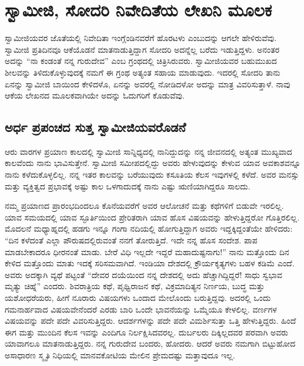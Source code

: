 
\chapter{ಸ್ವಾಮೀಜಿ, ಸೋದರಿ ನಿವೇದಿತೆಯ ಲೇಖನಿ ಮೂಲಕ}

 ಸ್ವಾಮೀಜಿಯವರ ಜೊತೆಯಲ್ಲಿ ನಿವೇದಿತಾ ಇಂಗ್ಲೆಂಡಿನವರೆಗೆ ಹೊರಟಳು ಎಂಬುದನ್ನು ಆಗಲೇ ಹೇಳಿರುವೆವು. ಸ್ವಾಮೀಜಿ ಪ್ರತಿದಿನವೂ ಆಕೆಯೊಡನೆ ಮಾತನಾಡುತ್ತಿದ್ದಾಗ ಸೋದರಿ ಅದನ್ನೆಲ್ಲ ಬರೆದು ಇಡುತ್ತಿದ್ದಳು. ಅನಂತರ ಅದನ್ನು “ನಾ ಕಂಡಂತೆ ನನ್ನ ಗುರುದೇವ” ಎಂಬ ಗ್ರಂಥದಲ್ಲಿ ಚಿತ್ರಿಸಿರುವರು. ಸ್ವಾಮೀಜಿಯವರ ಬಹುಮುಖದ ಶೀಲವನ್ನು ತಿಳಿದುಕೊಳ್ಳುವುದಕ್ಕೆ ನಮಗೆ ಈ ಗ್ರಂಥ ಅತ್ಯಂತ ಸಹಾಯ ಮಾಡುವುದು. ಇದರಲ್ಲಿ ಸೋದರಿ ತಾನು ಏನನ್ನು ಸ್ವಾಮೀಜಿ ಬಾಯಿಂದ ಕೇಳಿದಳೊ, ಏನನ್ನು ಅವರಲ್ಲಿ ನೋಡಿದಳೋ ಅದನ್ನು ಮಾತ್ರ ವಿವರಿಸುತ್ತಾಳೆ. ನಾವು ಆಕೆಯ ಲೇಖನದ ಮೂಲಕವಾಗಿಯೇ ಅದನ್ನು ಓದುಗರಿಗೆ ಕೊಡುವೆವು.

\section*{ಅರ್ಧ ಪ್ರಪಂಚದ ಸುತ್ತ ಸ್ವಾಮೀಜಿಯವರೊಡನೆ }

 ಆರು ವಾರಗಳ ಪ್ರಯಾಣ ಕಾಲದಲ್ಲಿ ಸ್ವಾಮೀಜಿ ಸಾನ್ನಿಧ್ಯದಲ್ಲಿ ನಾನಿದ್ದುದನ್ನು ನನ್ನ ಜೀವನದಲ್ಲಿ ಅತ್ಯಂತ ಮುಖ್ಯವಾದ ಕಾಲವೆಂದು ನಾನು ಭಾವಿಸುತ್ತೇನೆ. ಸ್ವಾಮೀಜಿ ಸಮೀಪದಲ್ಲಿದ್ದು ಅವರು ಹೇಳುವುದನ್ನು ಕೇಳುವ ಯಾವ ಅವಕಾಶವನ್ನೂ ನಾನು ಕಳೆದುಕೊಳ್ಳಲಿಲ್ಲ. ನನ್ನ ಇತರ ಕಾಲವನ್ನು ಬರೆಯುವುದು ಕಸೂತಿಯ ಕೆಲಸ ಇವುಗಳಲ್ಲಿ ಕಳೆದೆ. ಅವರ ಮನಸ್ಸು ಮತ್ತು ವ್ಯಕ್ತಿತ್ವದ ಪ್ರಭಾವಕ್ಕೆ ಅಷ್ಟು ಕಾಲ ಒಳಗಾದುದಕ್ಕೆ ನಾನು ಎಷ್ಟು ಋಣಿಯಾಗಿದ್ದರೂ ಸಾಲದು. 

 ನಮ್ಮ ಪ್ರಯಾಣದ ಪ್ರಾರಂಭದಿಂದಲೂ ಕೊನೆಯವರೆಗೆ ಅವರ ಆಲೋಚನೆ ಮತ್ತು ಕಥೆಗಳಿಗೆ ಬಿಡುವೇ ಇರಲಿಲ್ಲ. ಯಾವ ಸಮಯದಲ್ಲಿ ಯಾವ ಸ್ಫೂರ್ತಿಯಿಂದ ಪ್ರೇರಿತರಾಗಿ ಯಾವ ಹೊಸ ವಿಷಯವನ್ನು ಹೇಳುತ್ತಿದ್ದರೋ ಗೊತ್ತಿರಲಿಲ್ಲ. ಮೊದಲನೆ ಮಧ್ಯಾಹ್ನದಲ್ಲಿ ಹಡಗು ಇನ್ನೂ ಗಂಗಾ ನದಿಯಲ್ಲಿ ಹೋಗುತ್ತಿದ್ದಾಗ ಅವರು ಇದ್ದಕ್ಕಿದ್ದಂತೆಯೇ ಹೇಳಿದರು: “ದಿನ ಕಳೆದಂತೆ ಎಲ್ಲಾ ಪೌರುಷದಲ್ಲಿರುವಂತೆ ನನಗೆ ತೋರುತ್ತಿದೆ. ಇದೇ ನನ್ನ ಹೊಸ ಸಂದೇಶ. ಪಾಪ ಮಾಡಬೇಕಾದರೂ ಧೀರನಂತೆ ಮಾಡು. ಬೇರೆ ವಿಧಿ ಇಲ್ಲದೇ ಇದ್ದರೆ ಮಹಾದುಷ್ಟನಾಗು!” ನಾನು ಮತ್ತೊಂದು ದಿನ ಕೇಳಿದ ಮತ್ತೊಂದು ಮಾತು ಇದಕ್ಕೆ ಸರಿಸಮವಾಗಿದೆ. ಇಂಡಿಯಾ ದೇಶದಲ್ಲಿ ಕ್ರೌರ್ಯಕೃತ್ಯಗಳು ಬಹಳ ಕಡಿಮೆ ಎಂದೆ. ಅವರು ಅದಕ್ಕಾಗಿ ವ್ಯಥೆ ಪಟ್ಟಂತೆ “ದೇವರ ದಯೆಯಿಂದ ನನ್ನ ದೇಶದಲ್ಲಿ ಅದು ಹೆಚ್ಚಾಗಿದ್ದಿದ್ದರೆ! ಸಾಧು ಸ್ವಭಾವ ಮೃತ್ಯು ಚಿಹ್ನೆ” ಎಂದರು. ಶಿವರಾತ್ರಿಯ ಕಥೆ, ಪೃಥ್ವಿರಾಜನ ಕಥೆ, ವಿಕ್ರಮಾದಿತ್ಯನ ನಿರ್ಣಯ, ಬುದ್ಧ ಮತ್ತು ಯಶೋಧರೆಯರು, ಹೀಗೆ ನೂರಾರು ವಿಷಯಗಳು ಒಂದಾದ ಮೇಲೊಂದು ಬರುತ್ತಿದ್ದವು. ಅದರಲ್ಲಿ ಒಂದು ಗಮನಾರ್ಹವಾದ ವಿಷಯವೇನೆಂದರೆ ಎರಡು ಬಾರಿ ಒಂದೇ ಭಾವನೆಯನ್ನು ಒಮ್ಮೆಯೂ ಕೇಳಲಿಲ್ಲ. ವರ್ಣಗಳ ವಿಷಯವನ್ನು ಪದೇ ಪದೇ ವಿವರಿಸುತ್ತಿದ್ದರು. ಆದರ್ಶಗಳನ್ನು ಪದೇ ಪದೇ ವಿಮರ್ಶಿಸುತ್ತಾ ಒತ್ತಿ ಹೇಳುತ್ತಿದ್ದರು. ಹಿಂದೆ ಈಗ ಮತ್ತು ಮುಂದಿನ ಕೆಲಸ ಇವನ್ನು ಎಂದಿಗೂ ನಿರ್ಲಕ್ಷಿಸಿದವರಲ್ಲ. ದುರ್ಬಲರು ದಿಕ್ಕಿಲ್ಲದವರ ಪರವಾಗಿ ಅವರು ಯಾವಾಗಲೂ ಮಾತನಾಡುತ್ತಿದ್ದರು. ನನ್ನ ಗುರುದೇವ ಬಂದರು, ಹೋದರು. ಆದರೆ ಅವರು ನಮಗಾಗಿ ಬಿಟ್ಟುಹೋದ ಅಸಾಧಾರಣ ಸ್ಮೃತಿ ನಿಧಿಯಲ್ಲಿ ಮಾನವಕೋಟಿಯ ಮೇಲಿನ ಪ್ರೇಮದಷ್ಟು ಮತ್ತಾವುದೂ ಇಲ್ಲ. 

